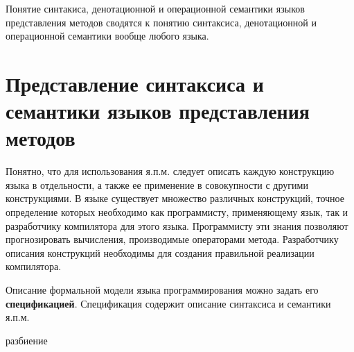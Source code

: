 Понятие синтакиса, денотационной и операционной семантики языков представления методов сводятся к понятию синтаксиса, денотационной и операционной семантики вообще любого языка.

\section{Представление синтаксиса и семантики языков представления методов}

Понятно, что для использования я.п.м. следует описать каждую конструкцию языка в отдельности, а также ее применение в совокупности с другими конструкциями. В языке существует множество различных конструкций, точное определение которых необходимо как программисту, применяющему язык, так и разработчику компилятора для этого языка. Программисту эти знания позволяют прогнозировать вычисления, производимые операторами метода. Разработчику описания конструкций необходимы для создания правильной реализации компилятора.

Описание формальной модели языка программирования можно задать его \textbf{спецификацией}. Спецификация содержит описание синтаксиса и семантики я.п.м.

\begin{SCn}
\begin{scnrelfromset}{разбиение}
    \begin{scnindent}
    \end{scnindent}
    \begin{scnindent}
    \end{scnindent}
    \begin{scnindent}
    \end{scnindent}
\end{scnrelfromset}
\end{SCn}

